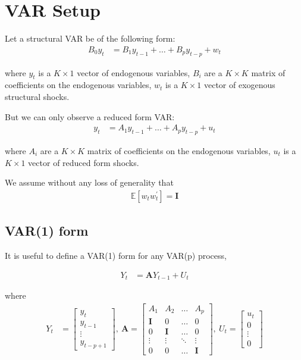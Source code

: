 \documentclass{article}
\newcommand*{\E}{\mathbb{E}}
\newcommand*{\I}{\mathbf{I}}
\begin{document}
\section{VAR Setup}

Let a structural VAR be of the following form:
\begin{align*}
  B_0 y_t &= B_1 y_{t-1} + \ldots + B_p y_{t-p} + w_t
\end{align*}

where
$y_t$ is a $K \times 1$ vector of endogenous variables,
$B_i$ are a $K \times K$ matrix of coefficients on the endogenous variables,
$w_t$ is a $K \times 1$ vector of exogenous structural shocks.

But we can only observe a reduced form VAR:
\begin{align*}
  y_t &= A_1 y_{t-1} + \dots + A_p y_{t-p} + u_t
\end{align*}

where
$A_i$ are a $K \times K$ matrix of coefficients on the endogenous variables,
$u_t$ is a $K \times 1$ vector of reduced form shocks.

We assume without any loss of generality that 
\begin{align*}
  \E[w_t w_t^\prime] = \I
\end{align*}

\subsection{VAR(1) form}
It is useful to define a VAR(1) form for any VAR(p) process,

\begin{align*}
  Y_t &= \mathbf{A} Y_{t-1} + U_t
\end{align*}

where
\begin{align*}
  Y_t &= \begin{bmatrix} y_t \\ y_{t-1} \\ \vdots \\ y_{t-p+1} \end{bmatrix}, \
  \mathbf{A} = \begin{bmatrix} A_1 & A_2 & \dots& A_p\\ \I & 0 & \dots & 0 \\ 0 & \I & \dots & 0 \\ \vdots & \vdots & \ddots & \vdots \\ 0 & 0 & \dots & \I \end{bmatrix}, \
  U_t = \begin{bmatrix} u_t \\ 0 \\ \vdots \\ 0 \end{bmatrix}
\end{align*}
\end{document}
